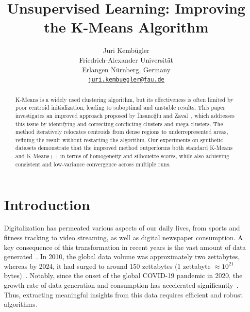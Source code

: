 \documentclass[10pt,twocolumn,letterpaper]{article}
\begin{document}
\title{Unsupervised Learning: Improving the K-Means Algorithm}

\author{Juri Kembügler\\
Friedrich-Alexander Universität\\
Erlangen Nürnberg, Germany\\
{\tt\small\href{mailto:juri.kembuegler@fau.de}{juri.kembuegler@fau.de}}
}

\maketitle

\begin{abstract}
    K-Means is a widely used clustering algorithm, but its effectiveness is often
    limited by poor centroid initialization, leading to suboptimal and unstable
    results. This paper investigates an improved approach proposed by İhsanoğlu and
    Zaval~\cite{Abdullah10601123}, which addresses this issue by identifying and
    correcting conflicting clusters and mega clusters. The method iteratively
    relocates centroids from dense regions to underrepresented areas, refining the
    result without restarting the algorithm. Our experiments on synthetic datasets
    demonstrate that the improved method outperforms both standard K-Means and
    K-Means++ in terms of homogeneity and silhouette scores, while also achieving
    consistent and low-variance convergence across multiple runs.
\end{abstract}


\section{Introduction}\label{sec:introduction}

Digitalization has permeated various aspects of our daily lives, from sports
and fitness tracking to video streaming, as well as digital newspaper
consumption. A key consequence of this transformation in recent years is the
vast amount \linebreak of data generated~\cite{Jain2010651}. In 2010, the
global data volume was approximately two zettabytes, whereas by 2024, it had
surged to around 150 zettabytes (1 zettabyte $\approx10^{21}$
bytes)~\cite{IDC_Statista_2024}. Notably, since the onset of the global
COVID-19 pandemic in 2020, the growth rate of data generation and consumption
has accelerated significantly~\cite{IDC_Statista_2024}. Thus, extracting
meaningful insights from this data requires efficient and robust algorithms.
\end{document}
